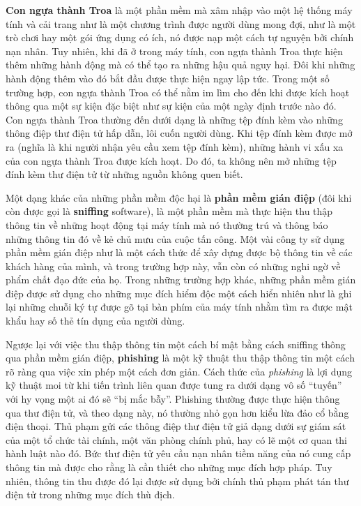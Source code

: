 \textbf{Con ngựa thành Troa} là một phần mềm mà xâm nhập vào một hệ thống máy tính và cải
trang như là một chương trình được người dùng mong đợi, như là một trò chơi hay một gói
ứng dụng có ích, nó được nạp một cách tự nguyện bởi chính nạn nhân. Tuy nhiên, khi đã ở
trong máy tính, con ngựa thành Troa thực hiện thêm những hành động mà có thể tạo ra những
hậu quả nguy hại. Đôi khi những hành động thêm vào đó bắt đầu được thực hiện ngay lập
tức. Trong một số trường hợp, con ngựa thành Troa có thể nằm im lìm cho đến khi được kích
hoạt thông qua một sự kiện đặc biệt như sự kiện của một ngày định trước nào đó. Con ngựa
thành Troa thường đến dưới dạng là những tệp đính kèm vào những thông điệp thư điện tử hấp
dẫn, lôi cuốn người dùng. Khi tệp đính kèm được mở ra (nghĩa là khi người nhận yêu cầu xem
tệp đính kèm), những hành vi xấu xa của con ngựa thành Troa được kích hoạt. Do đó, ta
không nên mở những tệp đính kèm thư điện tử từ những nguồn không quen biết.

Một dạng khác của những phần mềm độc hại là \textbf{phần mềm gián điệp} (đôi khi còn được
gọi là \textbf{sniffing} software), là một phần mềm mà thực hiện thu thập thông tin về
những hoạt động tại máy tính mà nó thường trú và thông báo những thông tin đó về kẻ chủ
mưu của cuộc tấn công. Một vài công ty sử dụng phần mềm gián điệp như là một cách thức để
xây dựng được bộ thông tin về các khách hàng của mình, và trong trường hợp này, vẫn còn có
những nghi ngờ về phẩm chất đạo đức của họ. Trong những trường hợp khác, những phần mềm
gián điệp được sử dụng cho những mục đích hiểm độc một cách hiển nhiên như là ghi lại
những chuỗi ký tự được gõ tại bàn phím của máy tính nhằm tìm ra được mật khẩu hay số thẻ
tín dụng của người dùng.


Ngược lại với việc thu thập thông tin một cách bí mật bằng cách sniffing thông qua phần
mềm gián điệp, \textbf{phishing} là một kỹ thuật thu thập thông tin một cách rõ ràng qua
việc xin phép một cách đơn giản. Cách thức của \textit{phishing} là lợi dụng kỹ thuật moi
từ khi tiến trình liên quan được tung ra dưới dạng vô số ``tuyến'' với hy vọng một ai đó
sẽ ``bị mắc bẫy''. Phishing thường được thực hiện thông qua thư điện tử, và theo dạng này,
nó thường nhỏ gọn hơn kiểu lừa đảo cổ bằng điện thoại. Thủ phạm gửi các thông điệp thư
điện tử giả dạng dưới sự giám sát của một tổ chức tài chính, một văn phòng chính phủ, hay
có lẽ một cơ quan thi hành luật nào đó. Bức thư điện tử yêu cầu nạn nhân tiềm năng của nó
cung cấp thông tin mà được cho rằng là cần thiết cho những mục đích hợp pháp. Tuy nhiên,
thông tin thu được đó lại được sử dụng bởi chính thủ phạm phát tán thư điện tử trong những
mục đích thù địch.

